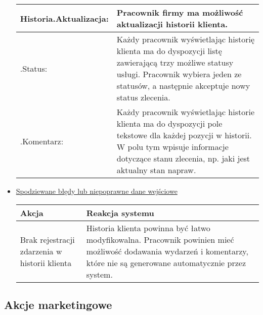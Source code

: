 \documentclass[a4paper,20pt]{article}
\begin{document}
\begin{itemize}
\begin{center}
\begin{tabularx}{\textwidth}[t]{XX}
\arrayrulecolor{black}\hline
\textbf{Historia.Aktualizacja:} & \textbf{Pracownik firmy ma możliwość aktualizacji historii klienta.} \\

\hline

\quad .Status: & 
\begin{minipage}[t]{\linewidth}%
Każdy pracownik wyświetlając historię klienta ma do dyspozycji listę zawierającą trzy możliwe statusy usługi. Pracownik wybiera jeden ze statusów, a następnie akceptuje nowy status zlecenia. 
\end{minipage}\\

\quad .Komentarz: & 
\begin{minipage}[t]{\linewidth}%
Każdy pracownik wyświetlając historie klienta ma do dyspozycji pole tekstowe dla każdej pozycji w historii. W polu tym wpisuje informacje dotyczące stanu zlecenia, np. jaki jest aktualny stan napraw.    
\end{minipage}\\



\end{tabularx}
\end{center}


\item \underline{Spodziewane błędy lub niepoprawne dane wejściowe}


\begin{center}
\begin{tabular}{ | m{15em} | m{7cm} | } 
\hline
\textbf{Akcja} & \textbf{Reakcja systemu} \\ 
\hline
Brak rejestracji zdarzenia w historii klienta & Historia klienta powinna być łatwo modyfikowalna. Pracownik powinien mieć możliwość dodawania wydarzeń i komentarzy, które nie są generowane automatycznie przez system.  \\ 
\hline
\end{tabular}
\end{center}

\end{itemize}






\subsection{Akcje marketingowe}
\end{document}
